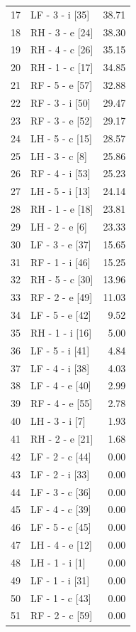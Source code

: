 \documentclass[11pt,a4paper]{article}
\begin{document}
\begin{longtable}{@{}rlr@{}}
    17 & LF - 3 - i [35] & 38.71 \\
    18 & RH - 3 - e [24] & 38.30 \\
    19 & RH - 4 - c [26] & 35.15 \\
    20 & RH - 1 - c [17] & 34.85 \\
    21 & RF - 5 - e [57] & 32.88 \\
    22 & RF - 3 - i [50] & 29.47 \\
    23 & RF - 3 - e [52] & 29.17 \\
    24 & LH - 5 - c [15] & 28.57 \\
    25 & LH - 3 - c [8] & 25.86 \\
    26 & RF - 4 - i [53] & 25.23 \\
    27 & LH - 5 - i [13] & 24.14 \\
    28 & RH - 1 - e [18] & 23.81 \\
    29 & LH - 2 - e [6] & 23.33 \\
    30 & LF - 3 - e [37] & 15.65 \\
    31 & RF - 1 - i [46] & 15.25 \\
    32 & RH - 5 - c [30] & 13.96 \\
    33 & RF - 2 - e [49] & 11.03 \\
    34 & LF - 5 - e [42] & 9.52 \\
    35 & RH - 1 - i [16] & 5.00 \\
    36 & LF - 5 - i [41] & 4.84 \\
    37 & LF - 4 - i [38] & 4.03 \\
    38 & LF - 4 - e [40] & 2.99 \\
    39 & RF - 4 - e [55] & 2.78 \\
    40 & LH - 3 - i [7] & 1.93 \\
    41 & RH - 2 - e [21] & 1.68 \\
    42 & LF - 2 - c [44] & 0.00 \\
    43 & LF - 2 - i [33] & 0.00 \\
    44 & LF - 3 - c [36] & 0.00 \\
    45 & LF - 4 - c [39] & 0.00 \\
    46 & LF - 5 - c [45] & 0.00 \\
    47 & LH - 4 - e [12] & 0.00 \\
    48 & LH - 1 - i [1] & 0.00 \\
    49 & LF - 1 - i [31] & 0.00 \\
    50 & LF - 1 - c [43] & 0.00 \\
    51 & RF - 2 - c [59] & 0.00 \\

\end{longtable}
\end{document}
